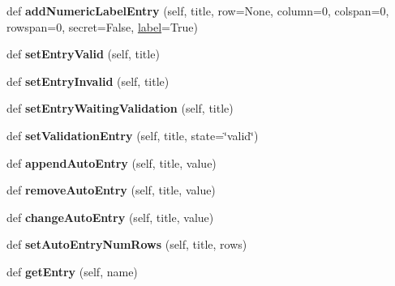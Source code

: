 \begin{DoxyCompactItemize}
\item 
\mbox{\label{classappjar_1_1gui_a15cf0790de1761fab919593902cb30f0}} 
def {\bfseries add\+Numeric\+Label\+Entry} (self, title, row=None, column=0, colspan=0, rowspan=0, secret=False, \hyperlink{classappjar_1_1gui_a161659a9096715ced2da924ab88ddecc}{label}=True)
\item 
\mbox{\label{classappjar_1_1gui_aa8b02d0d19d90775a3f90fe53d98d322}} 
def {\bfseries set\+Entry\+Valid} (self, title)
\item 
\mbox{\label{classappjar_1_1gui_a984721b7c89c9a8aa463296eadd7b590}} 
def {\bfseries set\+Entry\+Invalid} (self, title)
\item 
\mbox{\label{classappjar_1_1gui_adb7cdf239ed430a5990bb85ac3316eca}} 
def {\bfseries set\+Entry\+Waiting\+Validation} (self, title)
\item 
\mbox{\label{classappjar_1_1gui_a4749960e8d32ee3afb64eaaafee96060}} 
def {\bfseries set\+Validation\+Entry} (self, title, state=\char`\"{}valid\char`\"{})
\item 
\mbox{\label{classappjar_1_1gui_a7212618d8f064f41242bf140128b957c}} 
def {\bfseries append\+Auto\+Entry} (self, title, value)
\item 
\mbox{\label{classappjar_1_1gui_a0576e46f472dc2a8808c1e1ae95f9f4d}} 
def {\bfseries remove\+Auto\+Entry} (self, title, value)
\item 
\mbox{\label{classappjar_1_1gui_a6d0afe55f2498088f97db609d1d3e624}} 
def {\bfseries change\+Auto\+Entry} (self, title, value)
\item 
\mbox{\label{classappjar_1_1gui_aca198ce9815a826df79ad6a067b95886}} 
def {\bfseries set\+Auto\+Entry\+Num\+Rows} (self, title, rows)
\item 
\mbox{\label{classappjar_1_1gui_a53f352c16ba51436358352b5a67cbd46}} 
def {\bfseries get\+Entry} (self, name)
\item 
\mbox{\label{classappjar_1_1gui_a63153e330ee5405caa6238b0f8c62d6b}} 

\end{DoxyCompactItemize}
